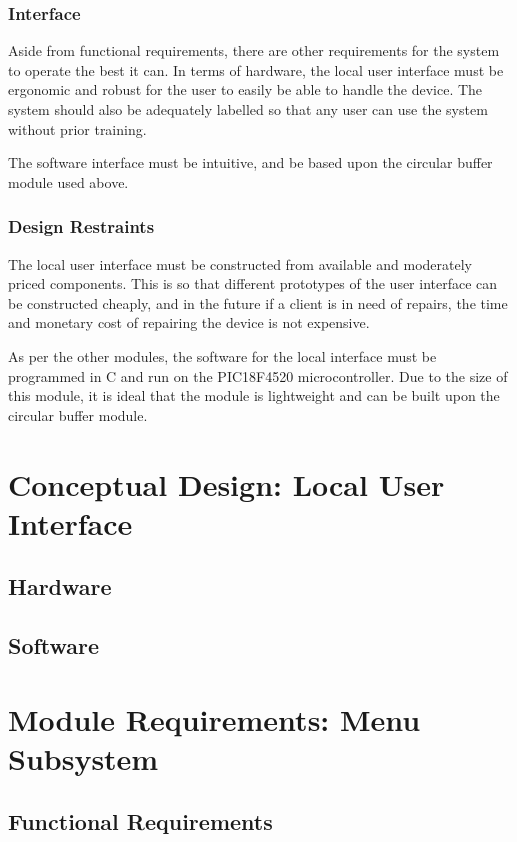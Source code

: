 \documentclass[]{report}
\begin{document}
\subsubsection{Interface}
Aside from functional requirements, there are other requirements for the system to operate the best it can. In terms of hardware, the local user interface must be ergonomic and robust for the user to easily be able to handle the device. The system should also be adequately labelled so that any user can use the system without prior training. 

The software interface must be intuitive, and be based upon the circular buffer module used above. 
\subsubsection{Design Restraints}
The local user interface must be constructed from available and moderately priced components. This is so that different prototypes of the user interface can be constructed cheaply, and in the future if a client is in need of repairs, the time and monetary cost of repairing the device is not expensive. 

As per the other modules, the software for the local interface must be programmed in C and run on the PIC18F4520 microcontroller. Due to the size of this module, it is ideal that the module is lightweight and can be built upon the circular buffer module.

\section{Conceptual Design: Local User Interface}
\subsection{Hardware}
\subsection{Software}


\section{Module Requirements: Menu Subsystem}
\subsection{Functional Requirements}
\end{document}
